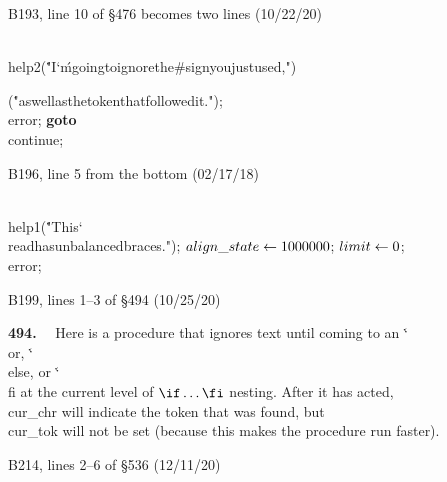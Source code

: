 \bugonpage B193, line 10 of \S476 becomes two lines (10/22/20)

\ninepoint\noindent\qquad
\\{help2}(\.{"I\char`\'m\]going\]to\]ignore\]the\]\#\]sign\]you\]just\]used,"})\par
\noindent\qquad
(\.{"as\]well\]as\]the\]token\]that\]followed\]it."});
\\{error}; {\bf goto} \\{continue};

\bugonpage B196, line 5 from the bottom (02/17/18)

\ninepoint\noindent\qquad\quad
\\{help1}(\.{"This\]\char`\\read\]has\]unbalanced\]braces."});
$\\{align\_state}\gets1000000$;
$\\{limit}\gets0$;
\\{error};

\bugonpage B199, lines 1--3 of \S494 (10/25/20)

\tenpoint\noindent
{\bf 494.} \ \ Here is a procedure that ignores text until coming to an \.{\char`\\or},
\.{\char`\\else}, or \.{\char`\\fi} at the current level
of $\.{\char`\\if}\ldots\.{\char`\\fi}$
nesting. After it has acted, \\{cur\_chr} will indicate the token that
was found, but \\{cur\_tok} will not be set (because this makes the
procedure run faster).


\bugonpage B214, lines 2--6 of \S536 (12/11/20)

